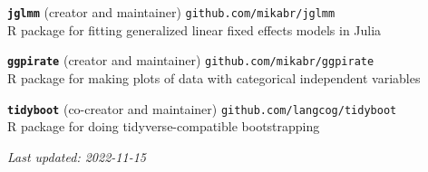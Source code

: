 \documentclass[11pt,]{article}
\begin{document}
\textbf{\texttt{jglmm}} (creator and maintainer)
\hfill \texttt{github.com/mikabr/jglmm}\\
\hspace*{0.333em}\hspace*{0.333em}\hspace*{0.333em}R package for fitting
generalized linear fixed effects models in Julia

\textbf{\texttt{ggpirate}} (creator and maintainer)
\hfill \texttt{github.com/mikabr/ggpirate}\\
\hspace*{0.333em}\hspace*{0.333em}\hspace*{0.333em}R package for making
plots of data with categorical independent variables

\textbf{\texttt{tidyboot}} (co-creator and maintainer)
\hfill \texttt{github.com/langcog/tidyboot}\\
\hspace*{0.333em}\hspace*{0.333em}\hspace*{0.333em}R package for doing
tidyverse-compatible bootstrapping

\centering
\vspace{2em}

\emph{Last updated: 2022-11-15}
\end{document}
